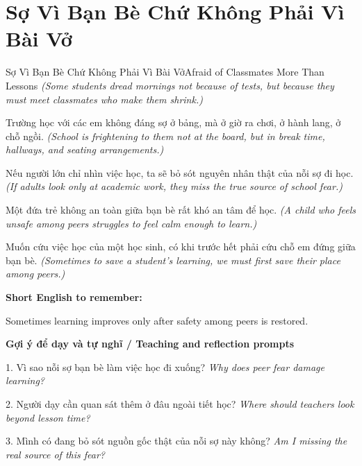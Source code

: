 \section{Sợ Vì Bạn Bè Chứ Không Phải Vì Bài Vở}
\begin{truyen}{Sợ Vì Bạn Bè Chứ Không Phải Vì Bài Vở}{Afraid of Classmates More Than Lessons}
\textit{(Some students dread mornings not because of tests, but because they must meet classmates who make them shrink.)}

Trường học với các em không đáng sợ ở bảng, mà ở giờ ra chơi, ở hành lang, ở chỗ ngồi.
\textit{(School is frightening to them not at the board, but in break time, hallways, and seating arrangements.)}

Nếu người lớn chỉ nhìn việc học, ta sẽ bỏ sót nguyên nhân thật của nỗi sợ đi học.
\textit{(If adults look only at academic work, they miss the true source of school fear.)}

Một đứa trẻ không an toàn giữa bạn bè rất khó an tâm để học.
\textit{(A child who feels unsafe among peers struggles to feel calm enough to learn.)}

\end{truyen}

\begin{baihoc}
Muốn cứu việc học của một học sinh, có khi trước hết phải cứu chỗ em đứng giữa bạn bè.
\textit{(Sometimes to save a student's learning, we must first save their place among peers.)}
\end{baihoc}

\begin{ghinhoanh}
\textbf{Short English to remember:}

Sometimes learning improves only after safety among peers is restored.

\end{ghinhoanh}

\begin{tuhocnhanh}
\textbf{Gợi ý để dạy và tự nghĩ / Teaching and reflection prompts}

1. Vì sao nỗi sợ bạn bè làm việc học đi xuống? \textit{Why does peer fear damage learning?}

2. Người dạy cần quan sát thêm ở đâu ngoài tiết học? \textit{Where should teachers look beyond lesson time?}

3. Mình có đang bỏ sót nguồn gốc thật của nỗi sợ này không? \textit{Am I missing the real source of this fear?}
\end{tuhocnhanh}
\ngancach

